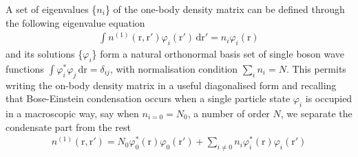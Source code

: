 \documentclass[12pt,a4paper]{book}
\renewcommand{\vec}[1]{\bm{\mathrm{#1}}}
\begin{document}
			A set of eigenvalues \{$n_i$\} of the one-body density matrix can be defined through the following eigenvalue equation
			\begin{align}
				\int \! n^{(1)}(\vec{r},\vec{r'})\varphi_i(\vec{r'}) \,\mathrm{d}\vec{r'} = n_i\varphi_i(\vec{r})
			\end{align}
			and its solutions \{$\varphi_i$\} form a natural orthonormal basis set of single boson wave functions $\int\!\varphi_i^*\varphi_j\,\mathrm{d}\vec{r}=\delta_{ij}$, with normalisation condition $\sum_i n_i=N$. This permits writing the on-body density matrix in a useful diagonalised form and recalling that Bose-Einstein condensation occurs when a single particle state $\varphi_i$ is occupied in a macroscopic way, say when $n_{i=0}=N_0$, a number of order $N$, we separate the condensate part from the rest
			\begin{align}
				n^{(1)}(\vec{r},\vec{r'}) = N_0\varphi_0^*(\vec{r})\varphi_0(\vec{r'})+\sum_{i\neq0}n_i\varphi_i^*(\vec{r})\varphi_i(\vec{r'}) \label{eq:obdm-diag}
			\end{align}
\end{document}
